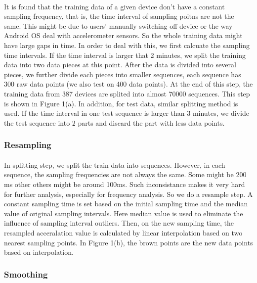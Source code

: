 \documentclass[11pt,letterpaper]{article}
\begin{document}
		\paragraph{} It is found that the training data of a given device don’t have a constant sampling frequency, that is, the time interval of sampling poitns are not the same. This might be due to users’ manually switching off device or the way Android OS deal with accelerometer sensors. So the whole training data might have large gaps in time. In order to deal with this, we first calcuate the sampling time intervals. If the time interval is larger that 2 minutes, we split the training data into two data pieces at this point. After the data is divided into several pieces, we further divide each pieces into smaller sequences, each sequence has 300 raw data points (we also test on 400 data points). At the end of this step, the training data from 387 devices are splited into almost 70000 sequences. This step is shown in Figure 1(a). In addition, for test data, similar splitting method is used. If the time interval in one test sequence is larger than 3 minutes, we divide the test sequence into 2 parts and discard the part with less data points.

		\subsubsection{Resampling}
		\paragraph{} In splitting step, we split the train data into sequences. However, in each sequence, the sampling frequencies are not always the same. Some might be 200 ms other others might be around 100ms. Such inconsistance makes it very hard for further analysis, especially for frequency analysis. So we do a resample step. A constant sampling time is set based on the initial sampling time and the median value of original sampling intervals. Here median value is used to eliminate the influence of sampling interval outliers. Then, on the new sampling time, the resampled acceralation value is calculated by linear interpolation based on two nearest sampling points. In Figure 1(b), the brown points are the new data points based on interpolation. 
		\subsubsection{Smoothing}
\end{document}
